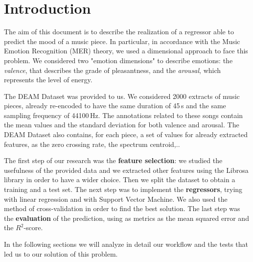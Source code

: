 \section{Introduction}

The aim of this document is to describe the realization of a regressor able to predict the mood of a music piece. In particular, in accordance with the Music Emotion Recognition (MER) theory, we used a dimensional approach to face this problem. We considered two "emotion dimensions" to describe emotions: the \emph{valence}, that describes the grade of pleasantness, and the \emph{arousal}, which represents the level of energy.

The DEAM Dataset was provided to us. We considered 2000 extracts of music pieces, already re-encoded to have the same duration of 45\,s and the same sampling frequency of 44100\,Hz. The annotations related to these songs contain the mean values and the standard deviation for both valence and arousal. The DEAM Dataset also contains, for each piece, a set of values for already extracted features, as the zero crossing rate, the spectrum centroid,..

The first step of our research was the \textbf{feature selection}: we studied the usefulness of the provided data and we extracted other features using the Librosa library in order to have a wider choice. Then we split the dataset to obtain a training and a test set. The next step was to implement the \textbf{regressors}, trying with linear regression and with Support Vector Machine. We also used the method of cross-validation in order to find the best solution. The last step was the \textbf{evaluation} of the prediction, using as metrics as the mean squared error and the $R^2$-score.

In the following sections we will analyze in detail our workflow and the tests that led us to our solution of this problem.


